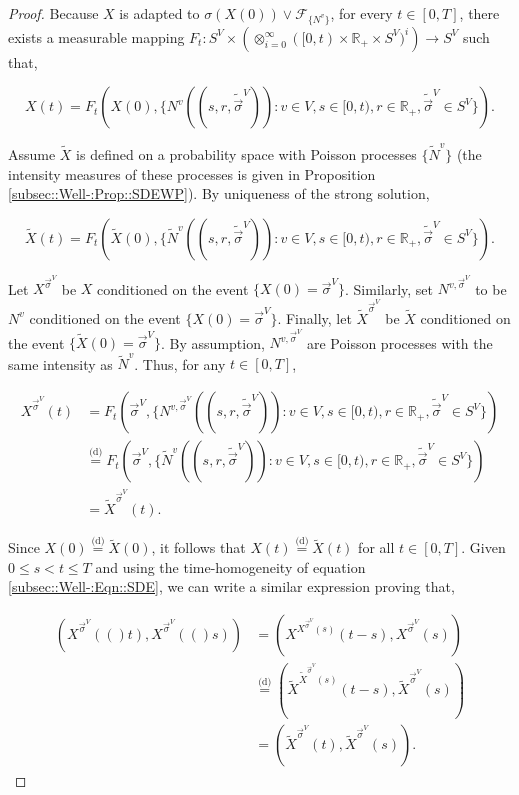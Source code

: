 \documentclass[12pt]{article}
\newcommand{\mb}{\mathbb}
\newcommand{\mc}{\mathcal}
\newcommand{\ra}{\rightarrow}
\newcommand{\deq}{\overset{\text{(d)}}{=}}			%
\renewcommand{\v}{v}							%
\renewcommand{\S}{S}							%
\newcommand{\s}{\sigma}							%
\newcommand{\sv}{\vec{\s}}						%
\newcommand{\T}{T}								%
\renewcommand{\t}{t}							%
\renewcommand{\tt}{s}							%
\newcommand{\F}{\mc{F}}							%
\newcommand{\X}{X}								%
\newcommand{\vind}[1]{^{#1}}					%
\newcommand{\carp}[1]{^{#1}}					%
\newcommand{\vsi}[1]{^{#1}}						%
\newcommand{\tp}[1]{(#1)}						%
\newcommand{\ts}[1]{_{#1}}						%
\newcommand{\poiss}{N}							%
\renewcommand{\r}{r}							%
\newcommand{\alt}[1]{\widetilde{#1}}			%
\newcommand{\pra}[1]{_{#1}}						%
\newcommand{\pst}[1]{^{#1}}						%
\newcommand{\vindpst}[2]{^{#1,#2}}				%
\begin{document}
\begin{proof}
Because \(\X\) is adapted to \(\sigma(\X\tp{0})\vee\F\pra{\{\poiss\vind{\v}\}}\), for every \(\t\in [0,\T]\), there exists a measurable mapping \(F\ts{\t}:\S\carp{V}\times \left(\otimes_{i=0}^\infty ([0,\t)\times\mb{R}_+\times\S\carp{V})^i\right)\ra \S\carp{V}\) such that,

\[\X\tp{\t} = F\ts{\t}\left(\X\tp{0},\{\poiss\vind{\v}((\tt,\r,\alt{\sv}\vsi{V})):\v\in V,\tt \in [0,\t),\r\in\mb{R}_+,\alt{\sv}\vsi{V} \in \S\carp{V}\}\right).\]

Assume \(\alt{X}\) is defined on a probability space with Poisson processes \(\{\alt{\poiss}\vind{\v}\}\) (the intensity measures of these processes is given in Proposition \ref{subsec::Well-:Prop::SDEWP}). By uniqueness of the strong solution,

\[\alt{X}\tp{\t} = F\ts{\t}\left(\alt{\X}\tp{0},\{\alt{\poiss}\vind{\v}((\tt,\r,\alt{\sv}\vsi{V})):\v\in V,\tt \in [0,\t),\r\in\mb{R}_+,\alt{\sv}\vsi{V} \in \S\carp{V}\}\right).\]

Let \(\X\pst{\sv\vsi{V}}\) be \(\X\) conditioned on the event \(\{\X\tp{0} = \sv\vsi{V}\}\). Similarly, set \(\poiss\vindpst{\v}{\sv\vsi{V}}\) to be \(\poiss\vind{\v}\) conditioned on the event \(\{\X\tp{0} = \sv\vsi{V}\}\). Finally, let \(\alt{\X}\pst{\sv\vsi{V}}\) be \(\alt{\X}\)  conditioned on the event \(\{\alt{\X}\tp{0} = \sv\vsi{V}\}\). By assumption, \(\poiss\vindpst{\v}{\sv\vsi{V}}\) are Poisson processes with the same intensity as \(\alt{\poiss}\vind{\v}\). Thus, for any \(\t \in [0,\T]\),

\begin{align*}
\X\pst{\sv\vsi{V}}\tp{t} &= F\ts{\t}\left(\sv\vsi{V},\{\poiss\vindpst{\v}{\sv\vsi{V}}((\tt,\r,\alt{\sv}\vsi{V})):\v\in V,\tt \in [0,\t),\r\in\mb{R}_+,\alt{\sv}\vsi{V} \in \S\carp{V}\}\right)\\
&\deq F\ts{\t}\left(\sv\vsi{V},\{\alt{\poiss}\vind{\v}((\tt,\r,\alt{\sv}\vsi{V})):\v\in V,\tt \in [0,\t),\r\in\mb{R}_+,\alt{\sv}\vsi{V} \in \S\carp{V}\}\right)\\
&= \alt{X}\pst{\sv\vsi{V}}\tp{\t}.
\end{align*}

Since \(\X\tp{0} \deq \alt{X}\tp{0}\), it follows that \(\X\tp{\t} \deq \alt{X}\tp{\t}\) for all \(\t\in [0,\T]\). Given \(0\leq \tt < \t \leq \T\) and using the time-homogeneity of equation \eqref{subsec::Well-:Eqn::SDE}, we can write a similar expression proving that,

\begin{align*}
\left(\X\pst{\sv\vsi{V}}\tp(\t),\X\pst{\sv\vsi{V}}\tp(\tt)\right) &= \left(\X\pst{\X\pst{\sv\vsi{V}}\tp{\tt}}\tp{\t-\tt},\X\pst{\sv\vsi{V}}\tp{\tt}\right)\\
&\deq \left(\alt{\X}\pst{\alt{\X}\pst{\sv\vsi{V}}\tp{\tt}}\tp{\t-\tt},\alt{\X}\pst{\sv\vsi{V}}\tp{\tt}\right)\\
&= \left(\alt{\X}\pst{\sv\vsi{V}}\tp{\t},\alt{\X}\pst{\sv\vsi{V}}\tp{\tt}\right).
\end{align*}


\end{proof}
\end{document}
